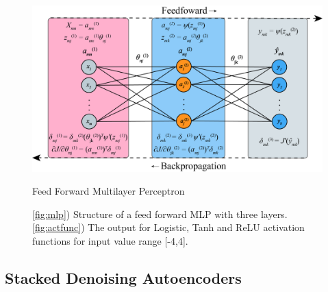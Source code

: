 \begin{figure}[h!]
    \centering
    \includegraphics[width=\textwidth]{img/backprop.png}
    \caption{Feed Forward Multilayer Perceptron}
    \label{fig:mlp}
    \caption{\ref{fig:mlp}) Structure of a feed forward MLP with three layers. \ref{fig:actfunc}) The output for Logistic, Tanh and ReLU activation functions for input value range [-4,4].}\label{fig:mlp_actfunc}
\end{figure}







\subsection{Stacked Denoising Autoencoders}


